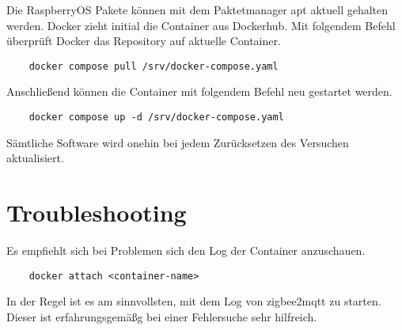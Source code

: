 Die RaspberryOS Pakete können mit dem Paktetmanager apt aktuell gehalten werden. Docker zieht initial die Container aus Dockerhub.
Mit folgendem Befehl überprüft Docker das Repository auf aktuelle Container.

\begin{lstlisting}
    docker compose pull /srv/docker-compose.yaml
\end{lstlisting}

Anschließend können die Container mit folgendem Befehl neu gestartet werden.

\begin{lstlisting}
    docker compose up -d /srv/docker-compose.yaml
\end{lstlisting}

Sämtliche Software wird onehin bei jedem Zurücksetzen des Versuchen aktualisiert.

\section{Troubleshooting}

Es empfiehlt sich bei Problemen sich den Log der Container anzuschauen.

\begin{lstlisting}
    docker attach <container-name>
\end{lstlisting}

In der Regel ist es am sinnvollsten, mit dem Log von zigbee2mqtt zu starten. Dieser ist erfahrungsgemäßg bei einer Fehlersuche sehr hilfreich.








